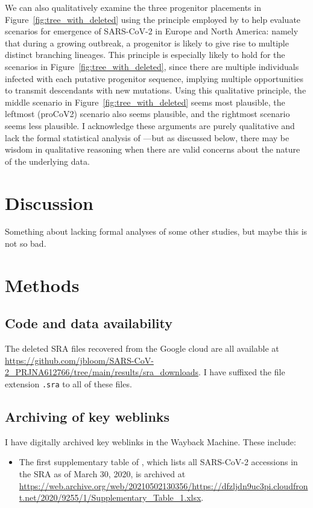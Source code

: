 \documentclass[9pt,twocolumn,twoside]{gsajnl_modified}
\begin{document}
We can also qualitatively examine the three progenitor placements in Figure~\ref{fig:tree_with_deleted} using the principle employed by \citet{worobey2020emergence} to help evaluate scenarios for emergence of SARS-CoV-2 in Europe and North America: namely that during a growing outbreak, a progenitor is likely to give rise to multiple distinct branching lineages.
This principle is especially likely to hold for the scenarios in Figure~\ref{fig:tree_with_deleted}, since there are multiple individuals infected with each putative progenitor sequence, implying multiple opportunities to transmit descendants with new mutations.
Using this qualitative principle, the middle scenario in Figure~\ref{fig:tree_with_deleted} seems most plausible, the leftmost (proCoV2) scenario also seems plausible, and the rightmost scenario seems less plausible.
I acknowledge these arguments are purely qualitative and lack the formal statistical analysis of \citet{worobey2020emergence}---but as discussed below, there may be wisdom in qualitative reasoning when there are valid concerns about the nature of the underlying data.

\section{Discussion}

Something about lacking formal analyses of some other studies, but maybe this is not so bad.

\section{Methods}

\subsection{Code and data availability}
The deleted SRA files recovered from the Google cloud are all available at  \url{https://github.com/jbloom/SARS-CoV-2_PRJNA612766/tree/main/results/sra_downloads}.
I have suffixed the file extension \texttt{.sra} to all of these files.

\subsection{Archiving of key weblinks}
I have digitally archived key weblinks in the Wayback Machine.
These include:
\begin{itemize}
\item The first supplementary table of \citet{farkas2020insights}, which lists all SARS-CoV-2 accessions in the SRA as of March 30, 2020, is archived at \url{https://web.archive.org/web/20210502130356/https://dfzljdn9uc3pi.cloudfront.net/2020/9255/1/Supplementary_Table_1.xlsx}. 
\end{itemize}
\end{document}
